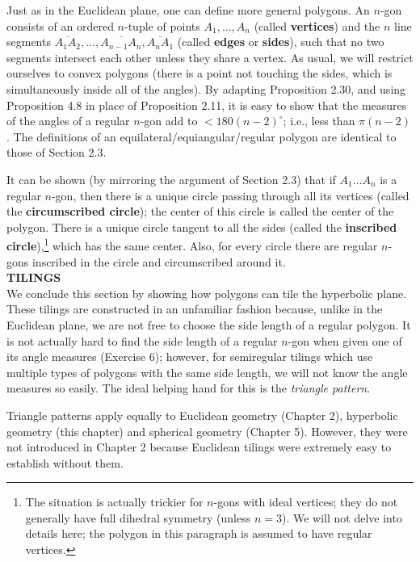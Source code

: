 \documentclass[leqno]{book}
\begin{document}
\noindent Just as in the Euclidean plane, one can define more general polygons. %
An $n$-gon consists of an ordered $n$-tuple of points $A_1,\dots,A_n$ (called \textbf{vertices}) and the $n$ line segments $\overline{A_1A_2},\dots,\overline{A_{n-1}A_n},\overline{A_nA_1}$ (called \textbf{edges} or \textbf{sides}), such that no two segments intersect each other unless they share a vertex.  As usual, we will restrict ourselves to convex polygons (there is a point not touching the sides, which is simultaneously inside all of the angles).  By adapting Proposition 2.30, and using Proposition 4.8 in place of Proposition 2.11, it is easy to show that the measures of the angles of a regular $n$-gon add to $<180(n-2)^\circ$; i.e., less than $\pi(n-2)$.  The definitions of an equilateral/equiangular/regular polygon are identical to those of Section 2.3.

It can be shown (by mirroring the argument of Section 2.3) that if $A_1\dots A_n$ is a regular $n$-gon, then there is a unique circle passing through all its vertices (called the \textbf{circumscribed circle}); the center of this circle is called the center of the polygon.  There is a unique circle tangent to all the sides (called the \textbf{inscribed circle}),\footnote{The situation is actually trickier for $n$-gons with ideal vertices; they do not generally have full dihedral symmetry (unless $n=3$).  We will not delve into details here; the polygon in this paragraph is assumed to have regular vertices.} which has the same center.  Also, for every circle there are regular $n$-gons inscribed in the circle and circumscribed around it.\\

\noindent\textbf{TILINGS}\\

\noindent We conclude this section by showing how polygons can tile the hyperbolic plane.  These tilings are constructed in an unfamiliar fashion because, unlike in the Euclidean plane, we are not free to choose the side length of a regular polygon.  It is not actually hard to find the side length of a regular $n$-gon when given one of its angle measures (Exercise 6); however, for semiregular tilings which use multiple types of polygons with the same side length, we will not know the angle measures so easily.  The ideal helping hand for this is the \emph{triangle pattern}.

Triangle patterns apply equally to Euclidean geometry (Chapter 2), hyperbolic geometry (this chapter) and spherical geometry (Chapter 5).  However, they were not introduced in Chapter 2 because Euclidean tilings were extremely easy to establish without them.
\end{document}
